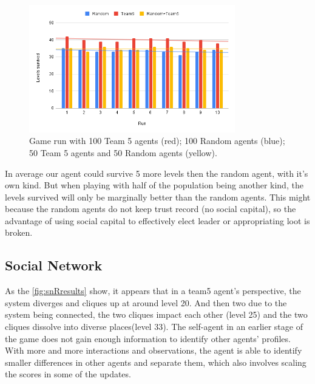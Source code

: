 \begin{figure}[!ht]
    \centering
    \includegraphics[width=0.8\textwidth]{008_team_5_agent_design/images/Team5vsRandom.png}
    \caption{Game run with 100 Team 5 agents (red); 100 Random agents (blue); 50 Team 5 agents and 50 Random agents (yellow).}
    \label{fig:Team5vsRandom}
\end{figure}

In average our agent could survive 5 more levels then the random agent, with it's own kind. But when playing with half of the population being another kind, the levels survived will only be marginally better than the random agents. This might because the random agents do not keep trust record (no social capital), so the advantage of using social capital to effectively elect leader or appropriating loot is broken.

\subsection{Social Network}

As the \ref{fig:snRresults} show, it appears that in a team5 agent's perspective, the system diverges and cliques up at around level 20. And then two due to the system being connected, the two cliques impact each other (level 25) and the two cliques dissolve into diverse places(level 33). The self-agent in an earlier stage of the game does not gain enough information to identify other agents' profiles. With more and more interactions and observations, the agent is able to identify smaller differences in other agents and separate them, which also involves scaling the scores in some of the updates.

